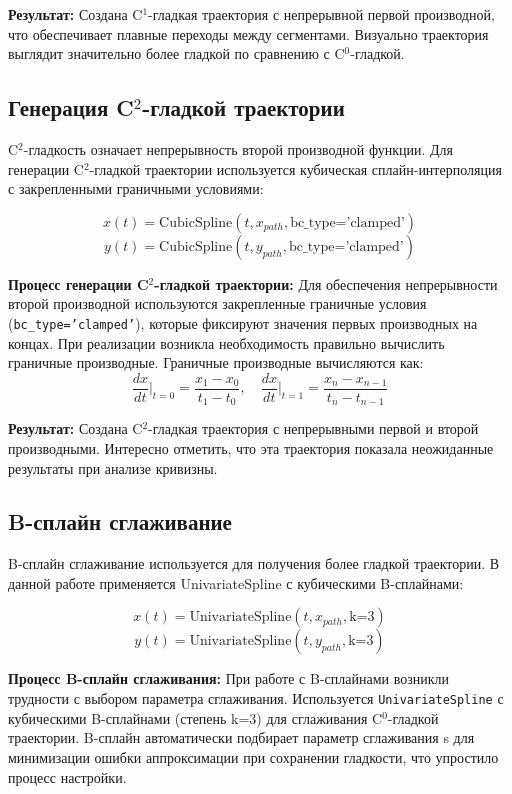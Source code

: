 \textbf{Результат:} Создана C$^1$-гладкая траектория с непрерывной первой производной, что обеспечивает плавные переходы между сегментами. Визуально траектория выглядит значительно более гладкой по сравнению с C$^0$-гладкой.

\subsection{Генерация C$^2$-гладкой траектории}

C$^2$-гладкость означает непрерывность второй производной функции. Для генерации C$^2$-гладкой траектории используется кубическая сплайн-интерполяция с закрепленными граничными условиями:

$$x(t) = \text{CubicSpline}(t, x_{path}, \text{bc\_type='clamped'})$$
$$y(t) = \text{CubicSpline}(t, y_{path}, \text{bc\_type='clamped'})$$

\textbf{Процесс генерации C$^2$-гладкой траектории:} Для обеспечения непрерывности второй производной используются закрепленные граничные условия (\texttt{bc\_type='clamped'}), которые фиксируют значения первых производных на концах. При реализации возникла необходимость правильно вычислить граничные производные. Граничные производные вычисляются как:
$$\frac{dx}{dt}\bigg|_{t=0} = \frac{x_1 - x_0}{t_1 - t_0}, \quad \frac{dx}{dt}\bigg|_{t=1} = \frac{x_n - x_{n-1}}{t_n - t_{n-1}}$$

\textbf{Результат:} Создана C$^2$-гладкая траектория с непрерывными первой и второй производными. Интересно отметить, что эта траектория показала неожиданные результаты при анализе кривизны.

\subsection{B-сплайн сглаживание}

B-сплайн сглаживание используется для получения более гладкой траектории. В данной работе применяется UnivariateSpline с кубическими B-сплайнами:

$$x(t) = \text{UnivariateSpline}(t, x_{path}, \text{k=3})$$
$$y(t) = \text{UnivariateSpline}(t, y_{path}, \text{k=3})$$

\textbf{Процесс B-сплайн сглаживания:} При работе с B-сплайнами возникли трудности с выбором параметра сглаживания. Используется \texttt{UnivariateSpline} с кубическими B-сплайнами (степень k=3) для сглаживания C$^0$-гладкой траектории. B-сплайн автоматически подбирает параметр сглаживания s для минимизации ошибки аппроксимации при сохранении гладкости, что упростило процесс настройки.

